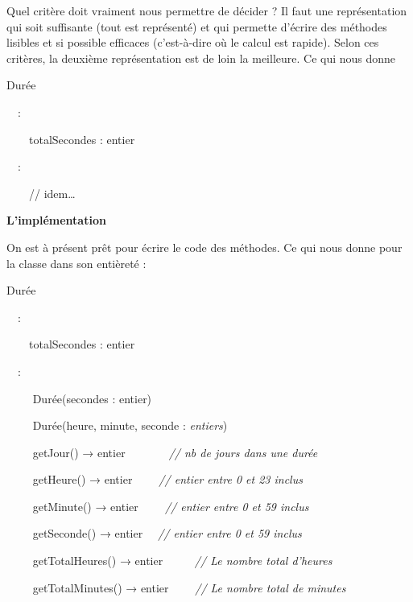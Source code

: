 {
Quel critère doit vraiment nous permettre de décider ? Il faut une
représentation qui soit suffisante (tout est représenté) et qui
permette d’écrire des méthodes lisibles et si possible efficaces
(c'est-à-dire où le calcul est rapide). Selon ces
critères, la deuxième représentation est de loin la meilleure. Ce qui
nous donne}

{\sffamily
{} Durée}

{\sffamily
\ \ :}

{\sffamily
\ \ \ \ totalSecondes : entier}

{\sffamily
\ \ :}

{\sffamily
\ \ \ \ // idem…}

{\sffamily
{}}

{\sffamily\bfseries\upshape
L'implémentation}

{
On est à présent prêt pour écrire le code des méthodes. Ce qui nous
donne pour la classe dans son entièreté :}

{\sffamily
{} Durée}

{\sffamily
\ \ :}

{\sffamily
\ \ \ \ totalSecondes : entier}

{\sffamily
\ \ :}

{\sffamily
\ \ \ \  Durée(secondes : entier)}

{\sffamily
\ \ \ \  Durée(heure, minute, seconde :
\textit{entiers})}


\bigskip

{\sffamily
\ \ \ \  getJour() → entier~~~~~\textit{ \ \ //
nb de jours dans une durée}}

{\sffamily
\ \ \ \  getHeure() → entier~~\textit{ \ \ //
entier entre 0 et 23 inclus}}

{\sffamily
\ \ \ \  getMinute() → entier~ \textit{\ \ \ //
entier entre 0 et 59 inclus}}

{\sffamily
\ \ \ \  getSeconde() → entier\textit{ \ \ //
entier entre 0 et 59 inclus}}


\bigskip

{\sffamily
\ \ \ \  getTotalHeures() → entier~~~~~
\textit{// Le nombre total d’heures}}

{\sffamily
\ \ \ \  getTotalMinutes() → entier~~~~
\textit{// Le nombre total de minutes}}

